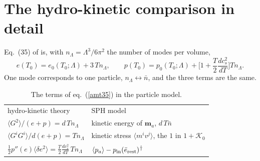 \documentclass[11pt,aps,preprint,nofootinbib,superscriptaddress,tightenlines]{revtex4-2}
\newcommand{\avg}[1]{\langle #1\rangle}
\newcommand{\unv}{\textsuperscript{$\dagger$}}
\def\st{\begin{equation}}
\def\stp{\end{equation}}
\def\Eq#1{eq.~(\ref{#1})}
\begin{document}
\section{The hydro-kinetic comparison in detail}
\label{app:hydrokin}

Eq.~(35) of \cite{amt} is, with $n_\Lambda=\Lambda^3/6\pi^2$ the number of modes per volume,
\st
e(T_0)=e_0(T_0;\Lambda)+3\,Tn_\Lambda,\qquad p(T_0)=p_0(T_0;\Lambda)+\Big[1+\frac T2\frac{dc_s^2}{dT}\Big]Tn_\Lambda .
\label{amt35}
\stp
One mode corresponds to one particle, $n_\Lambda\leftrightarrow\bar n$, and the three terms are the same.

\begin{table}[h]
\caption{The terms of \Eq{amt35} in the particle model.}
\begin{ruledtabular}
\begin{tabular}{ll}
hydro-kinetic theory & SPH model \\
\colrule
$\avg{G^2}/(e+p)=d\,Tn_\Lambda$ & kinetic energy of $\bm m_a$, $d\,T\bar n$ \\
$\avg{G^iG^i}/d(e+p)=Tn_\Lambda$ & kinetic stress $\avg{m^iv^j}$, the $1$ in $1+\mathcal K_0$ \\
$\tfrac12p''(e)\avg{\delta e^2}=\tfrac T2\tfrac{dc_s^2}{dT}\,Tn_\Lambda$ & $\avg{p_a}-p_{\rm in}(\bar e_{\rm rest})$\unv \\
\end{tabular}
\end{ruledtabular}
\end{table}
\end{document}
